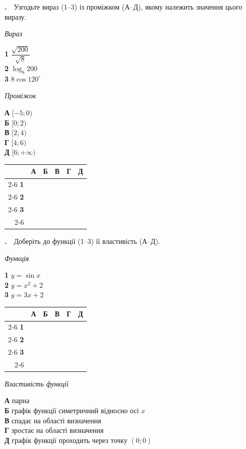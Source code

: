 \documentclass[12pt]{article}
\newcommand{\matchingGrid}{%
    \begingroup
    \renewcommand{\arraystretch}{1.15}
    \setlength{\tabcolsep}{4pt}
    \footnotesize
    \begin{tabular}{r|c|c|c|c|c|}
         \multicolumn{1}{c}{} & \multicolumn{1}{c}{\textbf{А}} & \multicolumn{1}{c}{\textbf{Б}} & \multicolumn{1}{c}{\textbf{В}} & \multicolumn{1}{c}{\textbf{Г}} & \multicolumn{1}{c}{\textbf{Д}} \\ \cline{2-6}
         \textbf{1} & \phantom{X} & \phantom{X} & \phantom{X} & \phantom{X} & \phantom{X} \\ \cline{2-6}
         \textbf{2} & & & & & \\ \cline{2-6}
         \textbf{3} & & & & & \\ \cline{2-6}
    \end{tabular}
    \endgroup
}
\newcounter{zad}
\newcommand{\zadtask}[1]{\stepcounter{zad}\par\vspace{0.3cm}\noindent\textbf{\thezad.}\ \ #1\par\vspace{0.2cm}}
\begin{document}
\zadtask{Узгодьте вираз (1--3) із проміжком (А--Д), якому належить значення цього виразу.
\vspace{0.3cm}
\noindent
\begin{minipage}[t]{0.45\textwidth}
\textit{Вираз}\par\vspace{0.15cm}
\textbf{1} \quad $\dfrac{\sqrt{200}}{\sqrt{8}}$\\[0.25cm]
\textbf{2} \quad $\log_8 200$\\[0.25cm]
\textbf{3} \quad $8 \cos 120^\circ$
\end{minipage}
\hfill
\begin{minipage}[t]{0.3\textwidth}
\textit{Проміжок}\par\vspace{0.15cm}
\textbf{А} \quad $[-5; 0)$\\[0.15cm]
\textbf{Б} \quad $[0; 2)$\\[0.15cm]
\textbf{В} \quad $[2; 4)$\\[0.15cm]
\textbf{Г} \quad $[4; 6)$\\[0.15cm]
\textbf{Д} \quad $[6; +\infty)$
\end{minipage}
\hfill
\begin{minipage}[t]{0.2\textwidth}
\vspace{0.4cm}
\begin{flushright}\matchingGrid\end{flushright}
\end{minipage}}

\zadtask{Доберіть до функції (1--3) її властивість (А--Д).\par
\vspace{0.3cm}
\noindent
\begin{minipage}[t]{0.30\textwidth}
\textit{Функція}\par\vspace{0.2cm}
\textbf{1} \quad $y = \sin x$\\[0.25cm]
\textbf{2} \quad $y = x^2 + 2$\\[0.25cm]
\textbf{3} \quad $y = 3x + 2$
\par\vspace{0.4cm}
\matchingGrid
\end{minipage}%
\hfill
\begin{minipage}[t]{0.66\textwidth}
\textit{Властивість функції}\par\vspace{0.2cm}
\textbf{А} \quad парна\\[0.15cm]
\textbf{Б} \quad графік функції симетричний відносно осі $x$\\[0.15cm]
\textbf{В} \quad спадає на області визначення\\[0.15cm]
\textbf{Г} \quad зростає на області визначення\\[0.15cm]
\textbf{Д} \quad графік функції проходить через точку $(0; 0)$
\end{minipage}}
\end{document}
